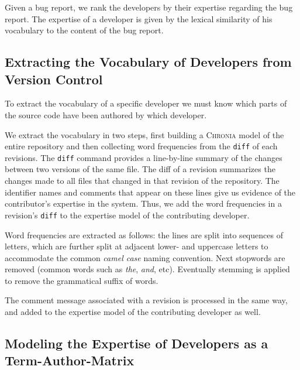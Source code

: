 Given a bug report, we rank the developers by their expertise regarding the bug report. The expertise of a developer is given by the lexical similarity of his vocabulary to the content of the bug report.

\subsection{Extracting the Vocabulary of Developers from Version Control}

To extract the vocabulary of a specific developer we must know which parts of the source code have been authored by which developer. 

We extract the vocabulary in two steps, first building a \textsc{Chronia} model of the entire repository \cite{Girb05c} and then collecting word frequencies from the \verb$diff$ of each revisions. %
The \verb$diff$ command provides a line-by-line summary of the changes between two versions of the same file. The diff of a revision summarizes the changes made to all files that changed in that revision of the repository. The identifier names and comments that appear on these lines give us evidence of the contributor's expertise in the system. Thus, we add the word frequencies in a revision's \verb$diff$ to the expertise model of the contributing developer.

Word frequencies are extracted as follows: the lines are split into sequences of letters, which are further split at adjacent lower- and uppercase letters to accommodate the common \emph{camel case} naming convention. Next stopwords are removed (\ie common words such as \emph{the}, \emph{and}, etc). Eventually stemming %
is applied to remove the grammatical suffix of words.

The comment message associated with a revision is processed in the same way, and added to the expertise model of the contributing developer as well. 


\subsection{Modeling the Expertise of Developers as a Term-Author-Matrix}

